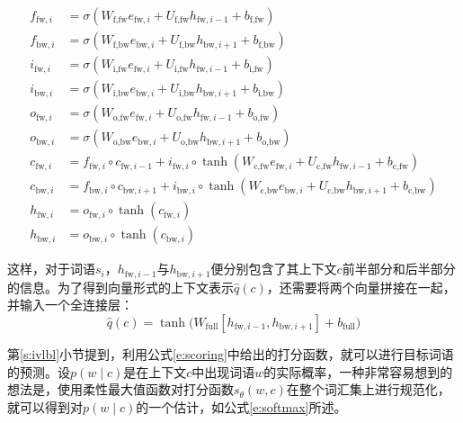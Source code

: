 \begin{align}
	f_{\text{fw}, i} &= \sigma(W_{\text{f}, \text{fw}} e_{\text{fw}, i} + U_{\text{f}, \text{fw}} h_{\text{fw}, i - 1} + b_{\text{f}, \text{fw}}) \label{e:bilstm begin} \\
	f_{\text{bw}, i} &= \sigma(W_{\text{f}, \text{bw}} e_{\text{bw}, i} + U_{\text{f}, \text{bw}} h_{\text{bw}, i + 1} + b_{\text{f}, \text{bw}}) \\
	i_{\text{fw}, i} &= \sigma(W_{\text{i}, \text{fw}} e_{\text{fw}, i} + U_{\text{i}, \text{fw}} h_{\text{fw}, i - 1} + b_{\text{i}, \text{fw}}) \\
	i_{\text{bw}, i} &= \sigma(W_{\text{i}, \text{bw}} e_{\text{bw}, i} + U_{\text{i}, \text{bw}} h_{\text{bw}, i + 1} + b_{\text{i}, \text{bw}}) \\
	o_{\text{fw}, i} &= \sigma(W_{\text{o}, \text{fw}} e_{\text{fw}, i} + U_{\text{o}, \text{fw}} h_{\text{fw}, i - 1} + b_{\text{o}, \text{fw}}) \\
	o_{\text{bw}, i} &= \sigma(W_{\text{o}, \text{bw}} e_{\text{bw}, i} + U_{\text{o}, \text{bw}} h_{\text{bw}, i + 1} + b_{\text{o}, \text{bw}}) \\
	c_{\text{fw}, i} &= f_{\text{fw}, i} \circ c_{\text{fw}, i - 1} + i_{\text{fw}, i} \circ \tanh(W_{\text{c}, \text{fw}} e_{\text{fw}, i} + U_{\text{c}, \text{fw}} h_{\text{fw}, i - 1} + b_{\text{c}, \text{fw}}) \\
	c_{\text{bw}, i} &= f_{\text{bw}, i} \circ c_{\text{bw}, i + 1} + i_{\text{bw}, i} \circ \tanh(W_{\text{c}, \text{bw}} e_{\text{bw}, i} + U_{\text{c}, \text{bw}} h_{\text{bw}, i + 1} + b_{\text{c}, \text{bw}}) \\
	h_{\text{fw}, i} &= o_{\text{fw}, i} \circ \tanh(c_{\text{fw}, i}) \\
	h_{\text{bw}, i} &= o_{\text{bw}, i} \circ \tanh(c_{\text{bw}, i}) \label{e:bilstm end}
\end{align}

这样，对于词语$s_i$，$h_{\text{fw}, i - 1}$与$h_{\text{bw}, i + 1}$便分别包含了其上下文$c$前半部分和后半部分的信息。为了得到向量形式的上下文表示$\hat{q}(c)$，还需要将两个向量拼接在一起，并输入一个全连接层：
\begin{equation}
\hat{q}(c) = \tanh\bigl(W_\text{full} [h_{\text{fw}, i - 1}, h_{\text{bw}, i + 1}] + b_\text{full}\bigr)
\end{equation}

第\ref{s:ivlbl}小节提到，利用公式\ref{e:scoring}中给出的打分函数，就可以进行目标词语的预测。设$p(w \mid c)$是在上下文$c$中出现词语$w$的实际概率，一种非常容易想到的想法是，使用柔性最大值函数对打分函数$s_\theta(w, c)$在整个词汇集上进行规范化，就可以得到对$p(w \mid c)$的一个估计，如公式\ref{e:softmax}所述。


